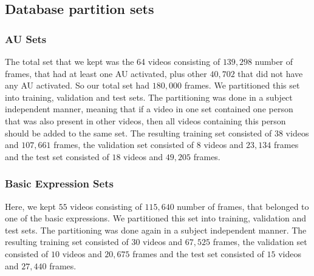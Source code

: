 \documentclass[a4paper, 10pt, conference]{ieeeconf}      %
\begin{document}
\begin{comment}
\begin{figure}[h]
\scalebox{1}{
\begin{tabular}{cc}
  \texttt{[image: happy.png]} &   \texttt{[image: surprise.png]} \\
 \texttt{[image: disgust.png]} &   \texttt{[image: fear.png]} \\
   \texttt{[image: sadness.png]} &   \texttt{[image: angry.png]} \\
\end{tabular}
}
\caption{Distributions of six basic expressions in the VA-Space}
\label{fig:basi_expr_dist_va}
\vskip -0.5cm
\end{figure}
\end{comment}


\subsection{Database partition sets}\label{sets}


\subsubsection{AU Sets}\label{sets}

The total set that we kept was the 64 videos consisting of $139,298$ number of frames, that had at least one AU activated, plus other $40,702$ that did not have any AU activated. So our total set had $180,000$ frames. We partitioned this set into training, validation and test sets. The partitioning was done in a subject independent manner, meaning that if a video in one set contained one person that was also present in other videos, then all videos containing this person should be added to the same set. 
The resulting training set consisted of $38$ videos and $107,661$ frames, the validation set consisted of $8$ videos and $23,134$ frames and the test set consisted of $18$ videos and $49,205$ frames.

\subsubsection{Basic Expression Sets}\label{sets2}

Here, we kept $55$ videos consisting of $115,640$ number of frames, that belonged to one of the basic expressions. We partitioned this set into training, validation and test sets. The partitioning was done again in a subject independent manner. 
The resulting training set consisted of $30$ videos and $67,525$ frames, the validation set consisted of $10$ videos and $20,675$ frames and the test set consisted of $15$ videos and $27,440$ frames.
\end{document}
